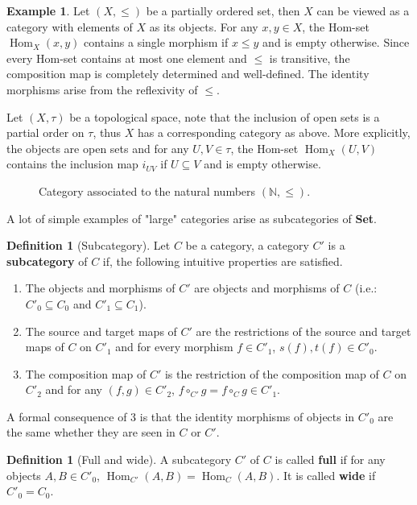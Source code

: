\documentclass{article}
\theoremstyle{definition}
\newtheorem{defn}[thm]{Definition}
\newtheorem{exmp}[thm]{Example}
\theoremstyle{remark}
\newcommand{\N}{\mathbb{N}}
\DeclareMathOperator{\Hom}{Hom}
\begin{document}
\begin{exmp}
	Let $(X, \leq)$ be a partially ordered set, then $X$ can be viewed as a category with elements of $X$ as its objects. For any $x,y \in X$, the Hom-set $\Hom_X(x,y)$ contains a single morphism if $x \leq y$ and is empty otherwise. Since every Hom-set contains at most one element and $\leq$ is transitive, the composition map is completely determined and well-defined. The identity morphisms arise from the reflexivity of $\leq$.
	
	Let $(X, \tau)$ be a topological space, note that the inclusion of open sets is a partial order on $\tau$, thus $X$ has a corresponding category as above. More explicitly, the objects are open sets and for any $U, V \in \tau$, the Hom-set $\Hom_X(U,V)$ contains the inclusion map $i_{UV}$ if $U\subseteq V$ and is empty otherwise.
	\begin{figure}[h]
		\centering
		\caption*{Category associated to the natural numbers $(\N, \leq)$.}
	\end{figure}
\end{exmp}
A lot of simple examples of "large" categories arise as subcategories of \textbf{Set}.
\begin{defn}[Subcategory]
	Let $C$ be a category, a category $C'$ is a \textbf{subcategory} of $C$ if, the following intuitive properties are satisfied.
	\begin{enumerate}
		\item The objects and morphisms of $C'$ are objects and morphisms of $C$ (i.e.: $C'_0 \subseteq C_0$ and $C'_1 \subseteq C_1$).
		\item The source and target maps of $C'$ are the restrictions of the source and target maps of $C$ on $C'_1$ and for every morphism $f \in C'_1$, $s(f), t(f) \in C'_0$.
		\item The composition map of $C'$ is the restriction of the composition map of $C$ on $C'_2$ and for any $(f,g) \in C'_2$, $f\circ_{C'} g = f \circ_{C} g \in C'_1$. 
	\end{enumerate}
	A formal consequence of 3 is that the identity morphisms of objects in $C'_0$ are the same whether they are seen in $C$ or $C'$.
\end{defn}
\begin{defn}[Full and wide]
	A subcategory $C'$ of $C$ is called \textbf{full} if for any objects $A,B \in C'_0$, $\Hom_{C'}(A,B) = \Hom_{C}(A,B)$. It is called \textbf{wide} if $C'_0 = C_0$.
\end{defn}
\end{document}
